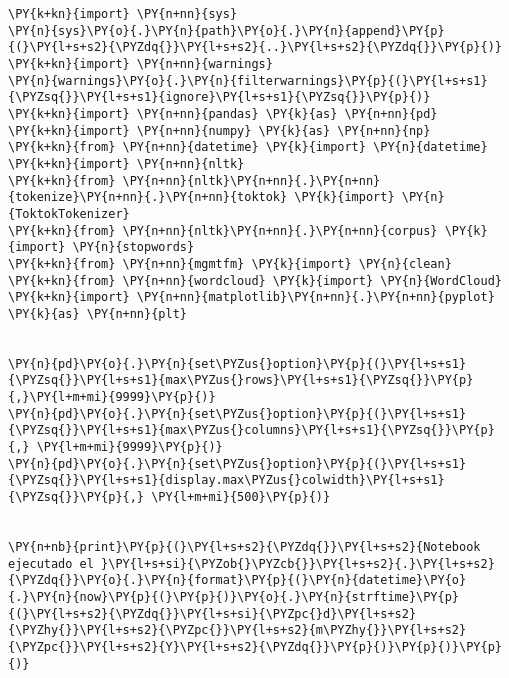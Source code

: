 \vspace{0.5cm}

    \begin{tcolorbox}[breakable, size=fbox, boxrule=1pt, pad at break*=1mm,colback=cellbackground, colframe=cellborder]
\begin{Verbatim}[commandchars=\\\{\}]
\PY{k+kn}{import} \PY{n+nn}{sys}
\PY{n}{sys}\PY{o}{.}\PY{n}{path}\PY{o}{.}\PY{n}{append}\PY{p}{(}\PY{l+s+s2}{\PYZdq{}}\PY{l+s+s2}{..}\PY{l+s+s2}{\PYZdq{}}\PY{p}{)}
\PY{k+kn}{import} \PY{n+nn}{warnings}
\PY{n}{warnings}\PY{o}{.}\PY{n}{filterwarnings}\PY{p}{(}\PY{l+s+s1}{\PYZsq{}}\PY{l+s+s1}{ignore}\PY{l+s+s1}{\PYZsq{}}\PY{p}{)}
\PY{k+kn}{import} \PY{n+nn}{pandas} \PY{k}{as} \PY{n+nn}{pd}
\PY{k+kn}{import} \PY{n+nn}{numpy} \PY{k}{as} \PY{n+nn}{np}
\PY{k+kn}{from} \PY{n+nn}{datetime} \PY{k}{import} \PY{n}{datetime}
\PY{k+kn}{import} \PY{n+nn}{nltk}
\PY{k+kn}{from} \PY{n+nn}{nltk}\PY{n+nn}{.}\PY{n+nn}{tokenize}\PY{n+nn}{.}\PY{n+nn}{toktok} \PY{k}{import} \PY{n}{ToktokTokenizer}
\PY{k+kn}{from} \PY{n+nn}{nltk}\PY{n+nn}{.}\PY{n+nn}{corpus} \PY{k}{import} \PY{n}{stopwords}
\PY{k+kn}{from} \PY{n+nn}{mgmtfm} \PY{k}{import} \PY{n}{clean}
\PY{k+kn}{from} \PY{n+nn}{wordcloud} \PY{k}{import} \PY{n}{WordCloud}
\PY{k+kn}{import} \PY{n+nn}{matplotlib}\PY{n+nn}{.}\PY{n+nn}{pyplot} \PY{k}{as} \PY{n+nn}{plt}


\PY{n}{pd}\PY{o}{.}\PY{n}{set\PYZus{}option}\PY{p}{(}\PY{l+s+s1}{\PYZsq{}}\PY{l+s+s1}{max\PYZus{}rows}\PY{l+s+s1}{\PYZsq{}}\PY{p}{,}\PY{l+m+mi}{9999}\PY{p}{)}
\PY{n}{pd}\PY{o}{.}\PY{n}{set\PYZus{}option}\PY{p}{(}\PY{l+s+s1}{\PYZsq{}}\PY{l+s+s1}{max\PYZus{}columns}\PY{l+s+s1}{\PYZsq{}}\PY{p}{,} \PY{l+m+mi}{9999}\PY{p}{)}
\PY{n}{pd}\PY{o}{.}\PY{n}{set\PYZus{}option}\PY{p}{(}\PY{l+s+s1}{\PYZsq{}}\PY{l+s+s1}{display.max\PYZus{}colwidth}\PY{l+s+s1}{\PYZsq{}}\PY{p}{,} \PY{l+m+mi}{500}\PY{p}{)}


\PY{n+nb}{print}\PY{p}{(}\PY{l+s+s2}{\PYZdq{}}\PY{l+s+s2}{Notebook ejecutado el }\PY{l+s+si}{\PYZob{}\PYZcb{}}\PY{l+s+s2}{.}\PY{l+s+s2}{\PYZdq{}}\PY{o}{.}\PY{n}{format}\PY{p}{(}\PY{n}{datetime}\PY{o}{.}\PY{n}{now}\PY{p}{(}\PY{p}{)}\PY{o}{.}\PY{n}{strftime}\PY{p}{(}\PY{l+s+s2}{\PYZdq{}}\PY{l+s+si}{\PYZpc{}d}\PY{l+s+s2}{\PYZhy{}}\PY{l+s+s2}{\PYZpc{}}\PY{l+s+s2}{m\PYZhy{}}\PY{l+s+s2}{\PYZpc{}}\PY{l+s+s2}{Y}\PY{l+s+s2}{\PYZdq{}}\PY{p}{)}\PY{p}{)}\PY{p}{)}
\end{Verbatim}
\end{tcolorbox}

